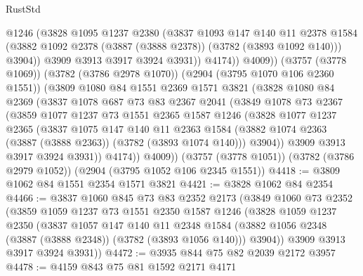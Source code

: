 \begin{lexlean}{RustStd}
\begin{coremodule}
                  @1246
                  (@3828
                    @1095
                    @1237
                    @2380
                    (@3837
                      @1093
                      @147
                      @140
                      @11
                      @2378
                      @1584
                      (@3882 @1092 @2378 (@3887 (@3888 @2378)) (@3782 (@3893 @1092 @140)))
                      @3904))
                  @3909
                  @3913
                  @3917
                  @3924
                  @3931))
              @4174))
          @4009))
      (@3757 (@3778 @1069))
      (@3782 (@3786 @2978 @1070))
      (@2904 (@3795 @1070 @106 @2360 @1551))
      (@3809
        @1080
        @84
        @1551
        @2369
        @1571
        @3821
        (@3828
          @1080
          @84
          @2369
          (@3837
            @1078
            @687
            @73
            @83
            @2367
            @2041
            (@3849
              @1078
              @73
              @2367
              (@3859
                @1077
                @1237
                @73
                @1551
                @2365
                @1587
                @1246
                (@3828
                  @1077
                  @1237
                  @2365
                  (@3837
                    @1075
                    @147
                    @140
                    @11
                    @2363
                    @1584
                    (@3882 @1074 @2363 (@3887 (@3888 @2363)) (@3782 (@3893 @1074 @140)))
                    @3904))
                @3909
                @3913
                @3917
                @3924
                @3931))
            @4174))
        @4009))
    (@3757 (@3778 @1051))
    (@3782 (@3786 @2979 @1052))
    (@2904 (@3795 @1052 @106 @2345 @1551))
@4418 := @3809 @1062 @84 @1551 @2354 @1571 @3821
@4421 := @3828 @1062 @84 @2354
@4466 := @3837
    @1060
    @845
    @73
    @83
    @2352
    @2173
    (@3849
      @1060
      @73
      @2352
      (@3859
        @1059
        @1237
        @73
        @1551
        @2350
        @1587
        @1246
        (@3828
          @1059
          @1237
          @2350
          (@3837
            @1057
            @147
            @140
            @11
            @2348
            @1584
            (@3882 @1056 @2348 (@3887 (@3888 @2348)) (@3782 (@3893 @1056 @140)))
            @3904))
        @3909
        @3913
        @3917
        @3924
        @3931))
@4472 := @3935 @844 @75 @82 @2039 @2172 @3957
@4478 := @4159 @843 @75 @81 @1592 @2171 @4171

\end{coremodule}
\end{lexlean}
